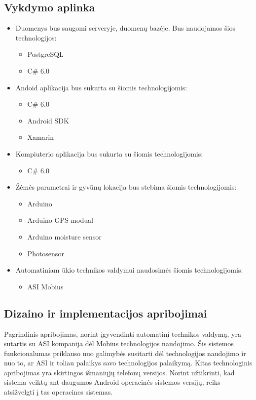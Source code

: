 \documentclass[oneside]{VUMIFPSkursinis}
\begin{document}
\subsection{Vykdymo aplinka}
\begin{itemize}
\item Duomenys bus saugomi serveryje, duomenų bazėje. Bus naudojamos šios technologijos:
	\begin{itemize}
		\item PostgreSQL
		\item C\# 6.0
	\end{itemize}
\item Andoid aplikacija bus sukurta su šiomis technologijomis:
	\begin{itemize}
		\item C\# 6.0 
		\item Android SDK
		\item Xamarin
	\end{itemize}
\pagebreak
\item Kompiuterio aplikacija bus sukurta su šiomis technologijomis:
	\begin{itemize}
		\item C\# 6.0
	\end{itemize}
\item Žėmės parametrai ir gyvūnų lokacija bus stebima šiomis technologijomis:
	\begin{itemize}
		\item Arduino
		\item Arduino GPS modual
		\item Arduino moisture sensor
		\item Photosensor
	\end{itemize}
\item Automatiniam ūkio technikos valdymui naudosimės šiomis technologijomis:
	\begin{itemize}		
		\item ASI Mobius
	\end{itemize}
\end{itemize}
\subsection{Dizaino ir implementacijos apribojimai}
Pagrindinis apribojimas, norint įgyvendinti automatinį technikos valdymą, yra sutartis su ASI kompanija dėl Mobius technologijos naudojimo. Šis sistemos funkcionalumas priklauso nuo galimybės susitarti dėl technologijos naudojimo ir nuo to, ar ASI ir toliau palaikys savo technologijos palaikymą. Kitas technologinis apribojimas yra skirtingos išmaniųjų telefonų versijos. Norint užtikrinti, kad sistema veiktų ant daugumos Android operacinės sistemos versijų, reiks atsižvelgti į tas operacines sistemas. 
\end{document}
